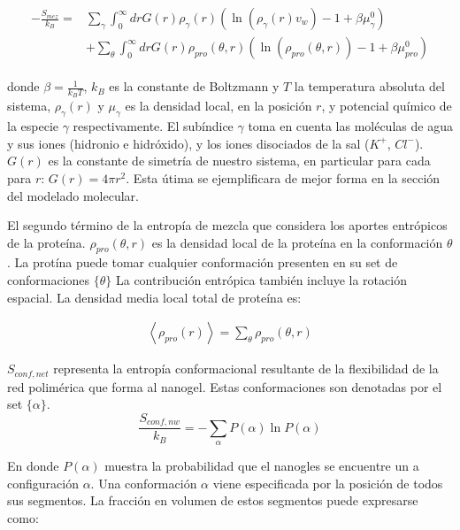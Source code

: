 \begin{align}
	\begin{aligned}
		-\frac{S_{mez}}{k_B}= &\sum_{\gamma}\int_0^\infty{dr G(r)\rho_\gamma(r)\left(\ln \left(\rho_\gamma (r)v_w\right) -1 + \beta\mu^0_\gamma\right)} \\
		&+ \sum_{\theta}\int_0^\infty{dr G(r)\rho_{pro}(\theta,r)\left(\ln \left(\rho_{pro}(\theta,r)\right) -1 + \beta\mu^0_{pro} \right)}
	\end{aligned}
\end{align}



\noindent donde $\beta = \frac{1}{k_BT}$, $k_B$ es la constante de Boltzmann y $T$ la temperatura absoluta del sistema, $\rho_\gamma(r)$ y $\mu_\gamma$ es la densidad local, en la posici\'on $r$, y potencial qu\'imico de la especie $\gamma$ respectivamente.
El sub\'indice $\gamma$ toma en cuenta las mol\'eculas de agua y sus iones (hidronio e hidr\'oxido), y los iones disociados de la sal ($K^+$, $Cl^-$). $G(r)$ es la constante de simetr\'ia de nuestro sistema, en particular para cada para $r$: $G(r) =4\pi r^2$. Esta \'utima se ejemplificara de mejor forma en la secci\'on del modelado molecular.

El segundo t\'ermino de la entrop\'ia de mezcla que considera los aportes entr\'opicos de la prote\'ina.
$\rho_{pro}(\theta,r)$ es la densidad local de la prote\'ina en la conformaci\'on  $\theta$.  La prot\'ina puede tomar cualquier conformaci\'on presenten en su set de conformaciones $\{\theta \}$
La contribuci\'on entr\'opica tambi\'en incluye la rotación espacial.
La densidad media local total de prote\'ina es: 


\begin{align}
	\left<\rho_{pro}(r)\right> = \sum_\theta{\rho_{pro}(\theta,r)}
\end{align}




$S_{conf,net}$ representa la entrop\'ia conformacional resultante de la flexibilidad de la red polim\'erica que forma al nanogel. Estas 
conformaciones son  denotadas por el set $\{\alpha\}$. 
\begin{equation}
	\frac{S_{conf,nw}}{k_B} = - \sum_{\alpha}{P(\alpha)\ln P(\alpha)}
\end{equation}


\noindent En donde $P(\alpha)$ muestra la probabilidad que el nanogles se encuentre un a configuraci\'on $\alpha$.
Una conformaci\'on $\alpha$ viene especificada por la posici\'on de todos sus segmentos. 
La fracci\'on en volumen de estos segmentos puede expresarse como:

